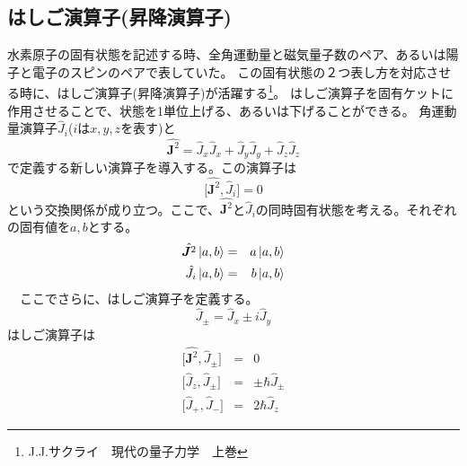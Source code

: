 \documentclass[11pt,a4paper]{jsarticle}
\begin{document}

\begin{boxnote}
  \subsection*{はしご演算子(昇降演算子)}
  水素原子の固有状態を記述する時、全角運動量と磁気量子数のペア、あるいは陽子と電子のスピンのペアで表していた。
  この固有状態の２つ表し方を対応させる時に、はしご演算子(昇降演算子)が活躍する\footnote{J.J.サクライ　現代の量子力学　上巻}。
  はしご演算子を固有ケットに作用させることで、状態を1単位上げる、あるいは下げることができる。
  角運動量演算子$\hat{J}_i$($i$は$x,y,z$を表す)と
  \begin{equation}
    \hat{\bm{J}^2} = \hat{J}_x \hat{J}_x + \hat{J}_y \hat{J}_y + \hat{J}_z \hat{J}_z
  \end{equation}
  で定義する新しい演算子を導入する。この演算子は
  \begin{equation}
    \bigl[\hat{\bm{J}^2},\hat{J}_i\bigr] = 0
  \end{equation}
  という交換関係が成り立つ。ここで、$\hat{\bm{J}^2}$と$\hat{J}_i$の同時固有状態を考える。それぞれの固有値を$a,b$とする。
  \begin{eqnarray}
    \hat{\bm{J}^2} \ket{a,b} &=& a \ket{a,b}\\
    \hat{J}_i \ket{a,b} &=& b \ket{a,b}
  \end{eqnarray}
　ここでさらに、はしご演算子を定義する。
 \begin{equation}
   \hat{J}_\pm = \hat{J}_x \pm i \hat{J}_y
 \end{equation}
 はしご演算子は
 \begin{eqnarray}
   \bigl[\hat{\bm{J}^2},\hat{J}_\pm \bigr] &=& 0 \\
   \bigl[\hat{J}_z,\hat{J}_\pm \bigr] &=& \pm \hbar \hat{J}_\pm \\
   \bigl[\hat{J}_+,\hat{J}_- \bigr] &=& 2 \hbar \hat{J}_z
 \end{eqnarray}

\end{boxnote}
\end{document}
